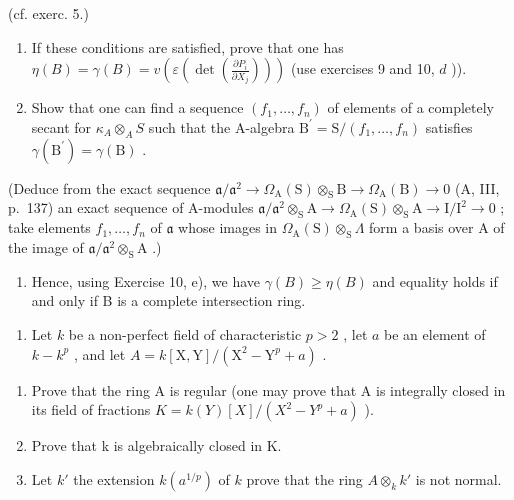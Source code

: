 (cf. exerc. 5.)

\begin{enumerate}
\def\labelenumi{\alph{enumi})}
\setcounter{enumi}{2}
\item
  If these conditions are satisfied, prove that one has \(\eta(B) = \gamma(B) = v(\varepsilon(\det(\frac{\partial P_i}{\partial X_j})))\) (use exercises 9 and 10, \(d\) )).
\item
  Show that one can find a sequence \((f_{1},\ldots,f_{n})\) of elements of a completely secant for \(\kappa_{A}\otimes_{A}S\) such that the A-algebra \(\mathrm{B}^{\prime}=\mathrm{S}/(f_{1},\ldots,f_{n})\) satisfies \(\gamma(\mathrm{B}^{\prime})=\gamma(\mathrm{B})\) .
\end{enumerate}

(Deduce from the exact sequence \(\mathfrak{a}/\mathfrak{a}^{2}\to\Omega_{\mathrm{A}}(\mathrm{S})\otimes_{\mathrm{S}}\mathrm{B}\to\Omega_{\mathrm{A}}(\mathrm{B})\to0\) (A, III, p.~137) an exact sequence of A-modules \(\mathfrak{a}/\mathfrak{a}^{2}\otimes_{\mathrm{S}}\mathrm{A}\to\Omega_{\mathrm{A}}(\mathrm{S})\otimes_{\mathrm{S}}\mathrm{A}\to\mathrm{I}/\mathrm{I}^{2}\to0\) ; take elements \(f_{1},\ldots,f_{n}\) of \(\mathfrak{a}\) whose images in \(\Omega_{\mathrm{A}}(\mathrm{S})\otimes_{\mathrm{S}}\Lambda\) form a basis over A of the image of \(\mathfrak{a}/\mathfrak{a}^{2}\otimes_{\mathrm{S}}\mathrm{A}\) .)

\begin{enumerate}
\def\labelenumi{\alph{enumi})}
\setcounter{enumi}{4}
\tightlist
\item
  Hence, using Exercise 10, e), we have \(\gamma(B) \geqslant \eta(B)\) and equality holds if and only if B is a complete intersection ring.
\end{enumerate}


\begin{enumerate}
\def\labelenumi{\arabic{enumi})}
\tightlist
\item
  Let \(k\) be a non-perfect field of characteristic \(p > 2\) , let \(a\) be an element of \(k - k^p\) , and let \(A = k[\mathrm{X},\mathrm{Y}] / (\mathrm{X}^2 -\mathrm{Y}^p +a)\) .
\end{enumerate}

\begin{enumerate}
\def\labelenumi{\alph{enumi})}
\item
  Prove that the ring A is regular (one may prove that A is integrally closed in its field of fractions \(K = k(Y)[X]/(X^{2} - Y^{p} + a)\) ).
\item
  Prove that k is algebraically closed in K.
\item
  Let \(k'\) the extension \(k(a^{1/p})\) of \(k\) prove that the ring \(A \otimes_k k'\) is not normal.
\end{enumerate}

